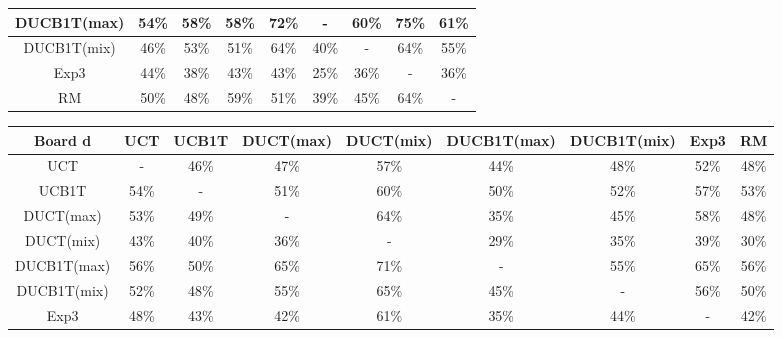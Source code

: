 \documentclass{article}
\begin{document}
\begin{table}[t]
\begin{tabular}{|c||c|c|c|c|c|c|c|c|}
 DUCB1T(max) & 54\% & 58\% & 58\% & 72\% &    - & 60\% & 75\% & 61\% \\ \hline 
 DUCB1T(mix) & 46\% & 53\% & 51\% & 64\% & 40\% &    - & 64\% & 55\% \\ \hline 
      Exp3 & 44\% & 38\% & 43\% & 43\% & 25\% & 36\% &    - & 36\% \\ \hline 
        RM & 50\% & 48\% & 59\% & 51\% & 39\% & 45\% & 64\% &    - \\ \hline 
\end{tabular}
\begin{tabular}{|c||c|c|c|c|c|c|c|c|}
									\hline
  Board d 		& UCT 	& UCB1T		& DUCT(max)	& DUCT(mix)	& DUCB1T(max)	& DUCB1T(mix)	& Exp3	& RM				\\ 	\hline\hline
   UCT &    - & 46\% & 47\% & 57\% & 44\% & 48\% & 52\% & 48\% \\ \hline 
 UCB1T & 54\% &    - & 51\% & 60\% & 50\% & 52\% & 57\% & 53\% \\ \hline 
   DUCT(max) & 53\% & 49\% &    - & 64\% & 35\% & 45\% & 58\% & 48\% \\ \hline 
   DUCT(mix) & 43\% & 40\% & 36\% &    - & 29\% & 35\% & 39\% & 30\% \\ \hline 
 DUCB1T(max) & 56\% & 50\% & 65\% & 71\% &    - & 55\% & 65\% & 56\% \\ \hline 
 DUCB1T(mix) & 52\% & 48\% & 55\% & 65\% & 45\% &    - & 56\% & 50\% \\ \hline 
      Exp3 & 48\% & 43\% & 42\% & 61\% & 35\% & 44\% &    - & 42\% \\ \hline 

\end{tabular}
\end{table}
\end{document}
